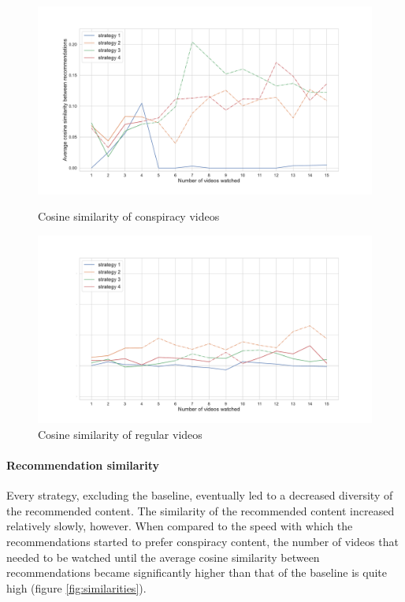 \documentclass[../main.tex]{subfiles}
\begin{document}
\begin{figure}
\centering
\begin{minipage}[b]{0.45\linewidth}
\includegraphics[width=\textwidth]{images/Con sim.pdf}
\caption{Cosine similarity of conspiracy videos}
\label{fig:con_sim}
\end{minipage}
\quad
\begin{minipage}[b]{0.45\linewidth}
\includegraphics[width=\textwidth]{images/Reg sim.pdf}
\caption{Cosine similarity of regular videos}
\label{fig:reg_sim}
\end{minipage}
\end{figure}


\paragraph{Recommendation similarity}
Every strategy, excluding the baseline, eventually led to a decreased diversity of the recommended content. The 
similarity of the recommended content increased relatively slowly, however. When compared to the speed with 
which the recommendations started to prefer conspiracy content, the number of videos that needed to be watched 
until the average cosine similarity between recommendations became significantly higher than that of the 
baseline is quite high (figure \ref{fig:similarities}). 
\end{document}
